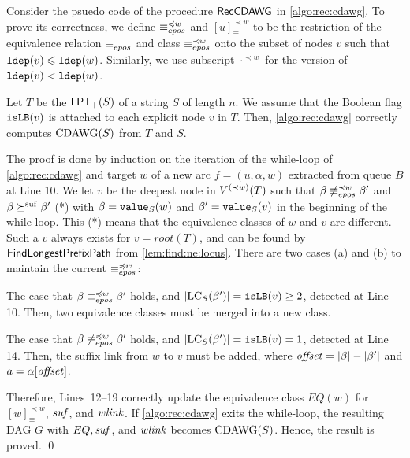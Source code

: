 Consider the psuedo code of the procedure $\RecCDAWG$ in \cref{algo:rec:cdawg}. To prove its correctness, we define  
  $\eqepos[\preceq w]$ and $[u]^{\prec w}_{\equiv}$ to be the restriction of
  the equivalence relation $\eqepos[]$ and class $\eqepos[\prec w]$
  onto the subset of nodes $v$ such that $\ldep(v) \le \ldep(w)$.
  Similarly, we use subscript $\cdot^{\prec w}$ for the version of $\ldep(v) < \ldep(w)$.


\begin{lemmarep}[correctness]\label{lem:cdawg:correctness}
  Let $T$ be the $\LPT(S)$ of a string $S$ of length $n$. 
  We assume that the Boolean flag $\op{isLB}(v)$ is attached to each explicit node $v$ in $T$. Then, \cref{algo:rec:cdawg} correctly computes $\CDAWG(S)$ from $T$ and $S$. 
\end{lemmarep}

\begin{proofsketch}
  The proof is done by induction on the iteration of the while-loop of \cref{algo:rec:cdawg} and target $w$ of a new arc $f = (u, \alpha, w)$ extracted from queue $B$ at Line 10. 
  We let $v$ be the deepest node in $V\rk{\prec w}(T)$ such that
  $\beta \not\eqepos[\prec w] \beta'$
  and $\beta \succeqsuf \beta'$ (*)
  with $\beta = \Value(w)$ and $\beta' = \Value(v)$ 
  in the beginning of the while-loop. This (*) means that the equivalence classes of $w$ and $v$ are different. 
  Such a $v$ always exists for $v = root(T)$, and 
  can be found by $\FindNonEquivLocus$ from \cref{lem:find:ne:locus}. 
  There are two cases (a) and (b) to maintain the current $\eqepos[\preceq w]$:
\begin{enumerate*}[(a)]
\item The case that $\beta \eqepos[\preceq w] \beta'$ holds, and $|\LC(\beta')| = \op{isLB}(v) \ge 2$, detected at Line 10. Then, two equivalence classes must be merged into a new class. 
\item The case that $\beta \not\eqepos[\preceq w] \beta'$ holds, and $|\LC(\beta')| = \op{isLB}(v) = 1$, detected at Line 14. Then, the suffix link from $w$ to $v$ must be added, where $\id{offset} = |\beta| - |\beta'|$ and $a = \alpha[\id{offset}]$. 
\end{enumerate*}
Therefore, Lines~12--19 correctly update the equivalence class $EQ(w)$ for $[w]^{\prec w}_{\equiv}$, $\id{suf}$, and $\id{wlink}$. If \cref{algo:rec:cdawg} exits the while-loop, the resulting DAG $G$ with $EQ, \id{suf}$, and $\id{wlink}$ becomes $\CDAWG(S)$. Hence, the result is proved.
\qed
\end{proofsketch}

